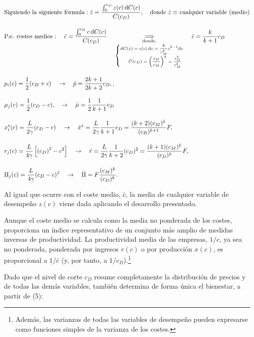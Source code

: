 \documentclass[10pt,a4paper]{article}
\begin{document}
$$\begin{aligned}
    &\text{Siguiendo la siguiente fórmula}: \bar{z} = \frac{\int_0^{c_D} z(c)\, \mathrm dC(c)}{C(c_D)},\quad\text{donde $\bar z\equiv$ cualquier variable (medio)}\\[1em]
    &\text{P.e. costes medios}:\quad \bar c=\frac{\int_0^{c_D}c\,\mathrm dC(c)}{C(c_D)}\quad\underset{\substack{
    \text{\scriptsize donde,}\\
    \text{\scriptsize$\left\{\begin{aligned}
        dC(c)=c(c)\,\mathrm dc=\frac{k}{c_M^k}c^{k-1}\mathrm dc\\
        C(c_D)=\left(\frac{c_D}{c_M}\right)^k=\frac{c_D^k}{c_M^k}.
    \end{aligned}\right.$}}}{\Longrightarrow}\quad\bar{c} = \frac{k}{k + 1} c_D\\[1em]
    &p_i(c) = \frac{1}{2}(c_D + c)\quad \to\quad \bar{p} = \frac{2k + 1}{2k + 2} c_D,,\\[1em]
    &\mu_j(c) = \frac{1}{2}(c_D - c),\quad\to\quad \bar{\mu} = \frac{1}{2}\frac{1}{k + 1} c_D\\[1em]
    &x_i^s(c) = \frac{L}{2\gamma}(c_D - c)\quad \to\quad\bar{x}^s = \frac{L}{2\gamma} \frac{1}{k + 1} c_D = \frac{(k + 2)(c_M)^k}{(c_D)^{k+1}} F,\\[1em]
    &r_j(c) = \frac{L}{4\gamma}\left[\left(c_D\right)^2 - c^2\right]\quad\to\quad \bar{r} = \frac{L}{2\gamma} \frac{1}{k + 2} (c_D)^2 = \frac{(k + 1)(c_M)^k}{(c_D)^k}F,\\[1em]
    &\Pi_j(c) = \frac{L}{4\gamma}(c_D - c)^2\quad\to\quad \bar{\Pi} = F\frac{(c_M)^k}{(c_D)^k}.
\end{aligned}$$

Al igual que ocurre con el coste medio, $\bar{c}$, la media de cualquier variable de desempeño $z(c)$ viene dada aplicando el desarrollo presentado. 

Aunque el coste medio se calcula como la media no ponderada de los costes, proporciona un índice representativo de un conjunto más amplio de medidas inversas de productividad. La productividad media de las empresas, $1/c$, ya sea no ponderada, ponderada por ingresos $r(c)$ o por producción $x(c)$, es proporcional a $1/\bar{c}$ (y, por tanto, a $1/c_D$).\footnote{%
    Además, las varianzas de todas las variables de desempeño pueden expresarse como funciones simples de la varianza de los costes.
} 

Dado que el nivel de corte $c_D$ resume completamente la distribución de precios y de todas las demás variables, también determina de forma única el bienestar, a partir de (5):
\end{document}
